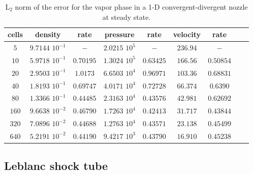 \documentclass[preprint,10pt]{elsarticle}
\begin{document}
\begin{table}[H]
\begin{center}
 \caption{\label{tbl:l2_norm_vap} L$_2$ norm of the error for the vapor phase in a 1-D convergent-divergent nozzle at steady state.}
 \begin{tabular}{|c|c|c|c|c|c|c|c|c|}
 \hline
cells & density             & rate      & pressure          & rate      & velocity & rate       \\ \hline
$5$   & $9.7144$ $10^{-1}$  & $-$       & $2.0215$ $10^{5}$ & $-$       & $236.94$ & $-$        \\ \hline
$10$  & $5.9718$ $10^{-1}$  & $0.70195$ & $1.3024$ $10^{5}$ & $0.63425$ & $166.56$ & $0.50854$  \\ \hline
$20$  & $2.9503$ $10^{-1}$  & $1.0173$  & $6.6503$ $10^{4}$ & $0.96971$ & $103.36$ & $0.68831$  \\ \hline
$40$  & $1.8193$ $10^{-1}$  & $0.69747$ & $4.0171$ $10^{4}$ & $0.72728$ & $66.374$ & $0.6390$   \\ \hline
$80$  & $1.3366$ $10^{-1}$  & $0.44485$ & $2.3163$ $10^{4}$ & $0.43576$ & $42.981$ & $0.62692$  \\ \hline
$160$ & $9.6638$ $10^{-2}$  & $0.46790$ & $1.7263$ $10^{4}$ & $0.42413$ & $31.717$ & $0.43844$  \\ \hline
$320$ & $7.0896$ $10^{-2}$  & $0.44688$ & $1.2763$ $10^{4}$ & $0.43571$ & $23.138$ & $0.45499$  \\ \hline
$640$ & $5.2191$ $10^{-2}$  & $0.44190$ & $9.4217$ $10^{3}$ & $0.43790$ & $16.910$ & $0.45238$  \\ \hline
\end{tabular}
\end{center}
\nonumber
\end{table}

\subsection{Leblanc shock tube} \label{sec:Leblanc}
\end{document}
